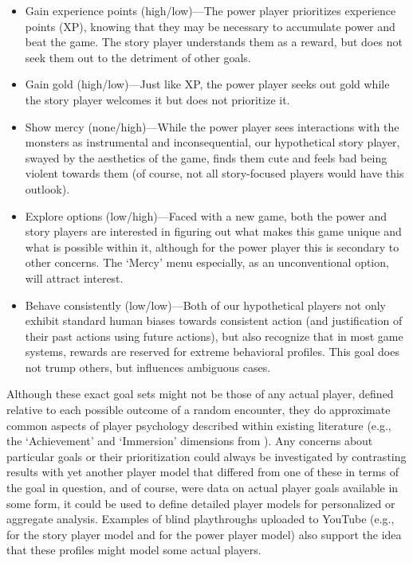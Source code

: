 \documentclass[arts,article,submit,moreauthors,pdftex,10pt,a4paper]{Definitions/mdpi}
\begin{document}
\begin{itemize}
  \item Gain experience points (high/low)---The power player prioritizes experience points (XP), knowing that they may be necessary to accumulate power and beat the game. The story player understands them as a reward, but does not seek them out to the detriment of other goals.
  \item Gain gold (high/low)---Just like XP, the power player seeks out gold while the story player welcomes it but does not prioritize it.
  \item Show mercy (none/high)---While the power player sees interactions with the monsters as instrumental and inconsequential, our hypothetical story player, swayed by the aesthetics of the game, finds them cute and feels bad being violent towards them (of course, not all story-focused players would have this outlook).
  \item Explore options (low/high)---Faced with a new game, both the power and story players are interested in figuring out what makes this game unique and what is possible within it, although for the power player this is secondary to other concerns. The `Mercy' menu especially, as an unconventional option, will attract interest.
  \item Behave consistently (low/low)---Both of our hypothetical players not only exhibit standard human biases towards consistent action (and justification of their past actions using future actions), but also recognize that in most game systems, rewards are reserved for extreme behavioral profiles. This goal does not trump others, but influences ambiguous cases.
\end{itemize}
Although these exact goal sets might not be those of any actual player, defined relative to each possible outcome of a random encounter, they do approximate common aspects of player psychology described within existing literature (e.g., the `Achievement' and `Immersion' dimensions from \cite{hamari2014player}).
%
Any concerns about particular goals or their prioritization could always be investigated by contrasting results with yet another player model that differed from one of these in terms of the goal in question, and of course, were data on actual player goals available in some form, it could be used to define detailed player models for personalized or aggregate analysis.
%
Examples of blind playthroughs uploaded to YouTube (e.g., \cite{fuandon2015lets} for the story player model and \cite{therpgminx2015lets} for the power player model) also support the idea that these profiles might model some actual players.
\end{document}
